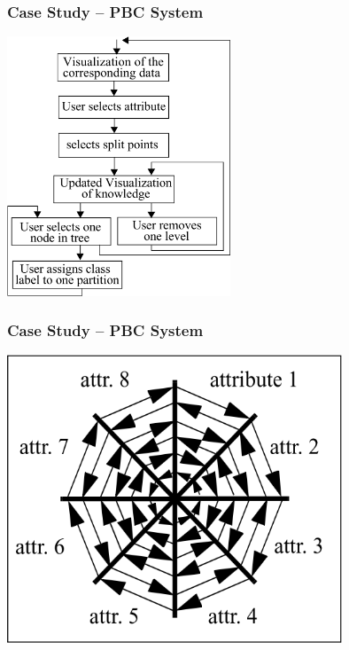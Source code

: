 \documentclass[xcolor=svgnames]{beamer}
\begin{document}
\begin{frame}
	\frametitle{Case Study -- PBC System}
	\begin{center}
		\includegraphics[width=0.5\textwidth]{2013-IA080-interactive-machine-learning/pbc-diagram.png}
	\end{center}
\end{frame}
\begin{frame}
	\frametitle{Case Study -- PBC System}
	\begin{center}
		\includegraphics[width=0.75\textwidth]{2013-IA080-interactive-machine-learning/pbc-circle-segments.png}
	\end{center}
\end{frame}
\end{document}
